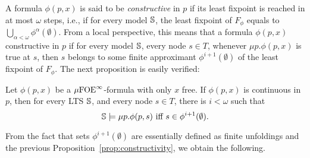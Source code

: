 A formula $\phi(p, x)$ is said to be \emph{constructive} in $p$ if its least fixpoint is reached in at most $\omega$ steps, i.e., if for every model $\mathbb{S}$, the least fixpoint of $F_\phi$ equals to $\bigcup_{\alpha < \omega} \phi^{\alpha}(\emptyset)$. From a local perspective, this means that a formula $\phi(p, x)$ constructive in $p$ if for every model $\mathbb{S}$,  every node $s \in T$, whenever $\mu p. \phi(p,x)$ is true at $s$, then $s$ belongs to some finite approximant $\phi^{i+1}(\emptyset)$ of the least fixpoint of $F_\phi$.
The next proposition is easily verified:%

\begin{proposition}\label{prop:constructivity}
Let $\phi(p,x)$ be a $\mu{\ensuremath{\mathrm{FOE}}}^\infty$-formula with only $x$ free. If $\phi(p,x)$ is continuous in $p$, then for every LTS $\mathbb{S}$, and every node $s \in T$, there is $i < \omega$ such that
\[\model \models \mu p. \phi(p,s) \text{ iff } s \in \phi^{i+1}(\emptyset).\]
\end{proposition}

From the fact that sets $\phi^{i+1}(\emptyset)$ are essentially defined as finite unfoldings and the previous Proposition~\ref{prop:constructivity}, we obtain the following.

